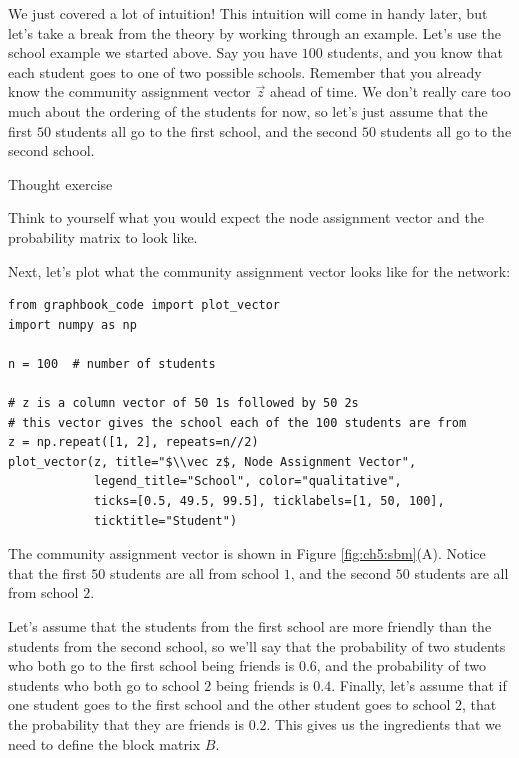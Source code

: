 We just covered a lot of intuition! This intuition will come in handy later, but let's take a break from the theory by working through an example. Let's use the school example we started above. Say you have $100$ students, and you know that each student goes to one of two possible schools. Remember that you already know the community assignment vector $\vec{z}$ ahead of time. We don't really care too much about the ordering of the students for now, so let's just assume that the first $50$ students all go to the first school, and the second $50$ students all go to the second school. 

\begin{floatingbox}[h]\caption{Thought exercise}
Think to yourself what you would expect the node assignment vector and the probability matrix to look like.
\end{floatingbox}

Next, let's plot what the community assignment vector looks like for the network:

\begin{lstlisting}[style=python]
from graphbook_code import plot_vector
import numpy as np

n = 100  # number of students

# z is a column vector of 50 1s followed by 50 2s
# this vector gives the school each of the 100 students are from
z = np.repeat([1, 2], repeats=n//2)
plot_vector(z, title="$\\vec z$, Node Assignment Vector",
            legend_title="School", color="qualitative", 
            ticks=[0.5, 49.5, 99.5], ticklabels=[1, 50, 100],
            ticktitle="Student")
\end{lstlisting}

The community assignment vector is shown in Figure \ref{fig:ch5:sbm}(A). Notice that the first $50$ students are all from school $1$, and the second $50$ students are all from school $2$.

Let's assume that the students from the first school are more friendly than the students from the second school, so we'll say that the probability of two students who both go to the first school being friends is $0.6$, and the probability of two students who both go to school $2$ being friends is $0.4$. Finally, let's assume that if one student goes to the first school and the other student goes to school $2$, that the probability that they are friends is $0.2$. This gives us the ingredients that we need to define the block matrix $B$. 

